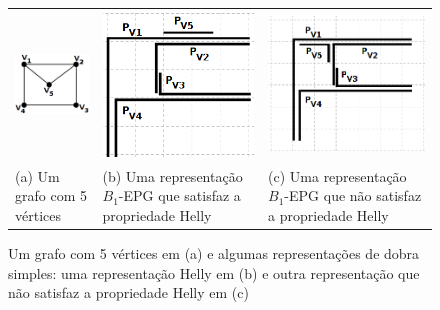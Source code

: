\begin{figure}[h]
  \centering
  \begin{tabular}{ p{4cm} p{5cm} p{5cm} }
    \centering \includegraphics[width=3cm]{./img/envelope.png} & \includegraphics[width=4cm]{./img/envelopeHellyGradeTransparente.png} & \includegraphics[width=4.6cm]{./img/envelopeNaoHellyGrade.png}
    \\
    \footnotesize \centering (a) Um grafo com  5 vértices & \footnotesize(b) Uma representação $B_1$-EPG que satisfaz a propriedade Helly & \footnotesize (c) Uma representação $B_1$-EPG que não satisfaz a propriedade Helly  \\

  \end{tabular}
\caption{Um grafo com 5 vértices em (a) e algumas representações de dobra simples: uma representação Helly em (b) e outra representação que não satisfaz a propriedade Helly em (c)} \label{fig:envelopeRepresentacoes}
\end{figure}